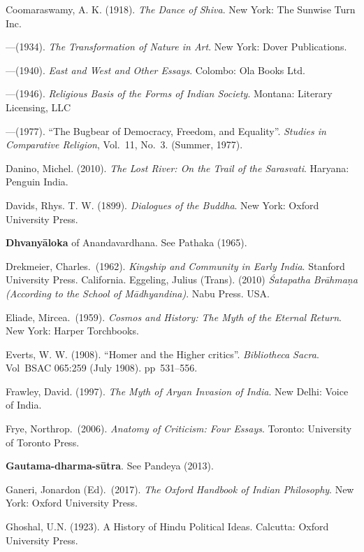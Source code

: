\begin{thebibliography}{99}
Coomaraswamy, A. K. (1918). {\sl The Dance of Shiva}. New York: The Sunwise Turn Inc. 

---\kern3pt(1934). {\sl The Transformation of Nature in Art}. New York: Dover Publications.

---\kern3pt(1940). {\sl East and West and Other Essays}. Colombo: Ola Books Ltd. 

---\kern3pt(1946). {\sl Religious Basis of the Forms of Indian Society}. Montana: Literary Licensing, LLC

---\kern3pt(1977). “The Bugbear of Democracy, Freedom, and Equality”. {\sl Studies in Comparative Religion}, Vol.~11, No.~3. (Summer, 1977). 

Danino, Michel. (2010). {\sl The Lost River: On the Trail of the Sarasvati}. Haryana: Penguin India.  

Davids, Rhys. T. W. (1899). {\sl Dialogues of the Buddha}. New York: Oxford University Press. 

{\bf Dhvanyāloka} of Anandavardhana. See Pathaka (1965).

Drekmeier, Charles.\ (1962). {\sl Kingship and Community in Early India}. Stanford University Press. California. Eggeling, Julius (Trans). (2010) {\sl Śatapatha Brāhmaṇa (According to the School of Mādhyandina)}. Nabu Press. USA. 

Eliade, Mircea.\ (1959). {\sl Cosmos and History: The Myth of the Eternal Return}. New York: Harper Torchbooks. 

Everts, W. W. (1908). “Homer and the Higher critics”. {\sl Bibliotheca Sacra}. Vol BSAC 065:259 (July 1908). pp~531--556. 

Frawley, David. (1997). {\sl The Myth of Aryan Invasion of India}.  New Delhi: Voice of India. 

Frye, Northrop.\ (2006). {\sl Anatomy of Criticism: Four Essays}. Toronto: University of Toronto Press. 

{\bf Gautama-dharma-sūtra}. See Pandeya (2013). 

Ganeri, Jonardon (Ed).\ (2017). {\sl The Oxford Handbook of Indian Philosophy}. New York: Oxford University Press. 

Ghoshal, U.N. (1923). A History of Hindu Political Ideas. Calcutta: Oxford University Press. 


\end{thebibliography}
